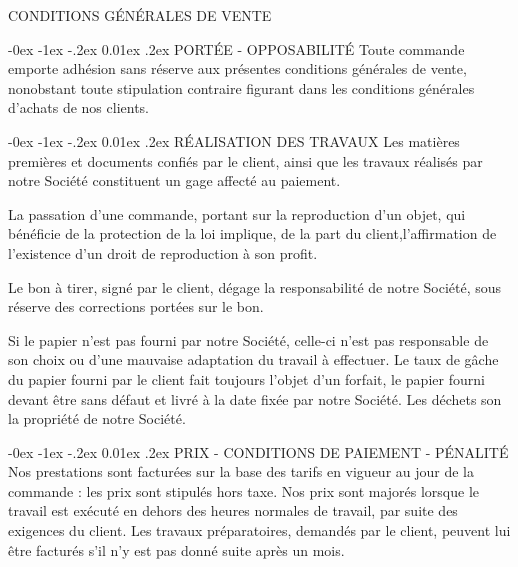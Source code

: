 \documentclass[a4paper, oneside, 10pt, french]{article}
\makeatletter
\renewcommand{\section}{\@startsection {section}{1}{\z@}%
             {-0ex \@plus -1ex \@minus -.2ex}%
             {0.01ex \@plus.2ex}%
             {\normalfont\normalsize\sffamily}}
\makeatother
\begin{document}
\begin{center}
\textcolor{chaumeil-violet}{\textsc{\Large CONDITIONS GÉNÉRALES DE VENTE}}
\end{center}
\begin{multicols}{2}

\begin{small}
\section{PORTÉE - OPPOSABILITÉ}
Toute commande emporte adhésion sans réserve aux présentes conditions générales de vente, nonobstant toute stipulation contraire figurant dans les conditions générales d’achats de nos clients.

\section{RÉALISATION DES TRAVAUX}
Les matières premières et documents confiés par le client, ainsi que les travaux réalisés par notre Société constituent un gage affecté au paiement.

La passation d’une commande, portant sur la reproduction d’un objet, qui bénéficie de la protection de la loi implique, de la part du client,l’affirmation de l’existence d’un droit de reproduction à son profit.

Le bon à tirer, signé par le client, dégage la responsabilité de notre Société, sous réserve des corrections portées sur le bon.

Si le papier n’est pas fourni par notre Société, celle-ci n’est pas responsable de son choix ou d’une mauvaise adaptation du travail à effectuer. Le taux de gâche du papier fourni par le client fait toujours l’objet d’un forfait, le papier fourni devant être sans défaut et livré à la date fixée par notre Société. Les déchets son la propriété de notre Société.

\section{PRIX - CONDITIONS DE PAIEMENT - PÉNALITÉ}
Nos prestations sont facturées sur la base des tarifs en vigueur au jour de la commande : les prix sont stipulés hors taxe. Nos prix sont majorés lorsque le travail est exécuté en dehors des heures normales de travail, par suite des exigences du client. Les travaux préparatoires, demandés par le client, peuvent lui être facturés s’il n’y est pas donné suite après un mois.


\end{small}
\end{multicols}
\end{document}
